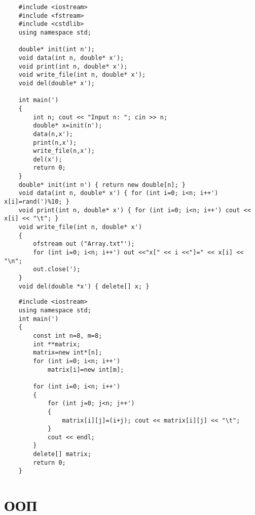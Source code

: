 \vspace{5cm}
\begin{lstlisting}
    #include <iostream>
    #include <fstream>
    #include <cstdlib>
    using namespace std;

    double* init(int n');
    void data(int n, double* x');
    void print(int n, double* x');
    void write_file(int n, double* x');
    void del(double* x');

    int main(')
    {
        int n; cout << "Input n: "; cin >> n;
        double* x=init(n');
        data(n,x');
        print(n,x');
        write_file(n,x');
        del(x');
        return 0;
    }
    double* init(int n') { return new double[n]; }
    void data(int n, double* x') { for (int i=0; i<n; i++') x[i]=rand(')%10; }
    void print(int n, double* x') { for (int i=0; i<n; i++') cout << x[i] << "\t"; }
    void write_file(int n, double* x')
    {
        ofstream out ("Array.txt"');
        for (int i=0; i<n; i++') out <<"x[" << i <<"]=" << x[i] << "\n";
        out.close(');
    }
    void del(double *x') { delete[] x; }
\end{lstlisting}
\vspace{5cm}
\begin{lstlisting}
    #include <iostream>
    using namespace std;
    int main(')
    {
        const int n=8, m=8;
        int **matrix;
        matrix=new int*[n];
        for (int i=0; i<n; i++')
            matrix[i]=new int[m];

        for (int i=0; i<n; i++')
        {
            for (int j=0; j<n; j++')
            {
                matrix[i][j]=(i+j); cout << matrix[i][j] << "\t";
            }
            cout << endl;
        }
        delete[] matrix;
        return 0;
    }
\end{lstlisting}


\section{ООП}
